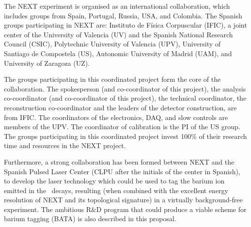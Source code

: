 The NEXT experiment is organised as an international collaboration, which includes groups from Spain, Portugal, Russia, USA, and Colombia. The Spanish groups participating in NEXT are: Instituto de Física Corpuscular (IFIC), a joint center of the University of Valencia (UV) and the Spanish National Research Council (CSIC), Polytechnic University of Valencia (UPV), University of Santiago de Compostela (US), Autonomic University of Madrid (UAM), and University of Zaragoza (UZ). 

The groups participating in this coordinated project form the core of the collaboration. The spokesperson (and co-coordinator of this project), the analysis co-coordinator (and co-coordinator of this project), the technical coordinator, the reconstruction co-coordinator and the leaders of the detector construction, are from IFIC. The coordinators of the electronics, DAQ, and slow controls are members of the UPV. The coordinator of calibration is the PI of the US group. The groups participating in this coordinated project invest 100\% of their research time and resources in the NEXT project. 

Furthermore, a strong collaboration has been  formed between NEXT and the Spanish Pulsed Laser Center (CLPU after the initials of the center in Spanish), to develop the laser technology which could be used to tag the barium ion emitted in the \bb\ decays, resulting (when combined with the excellent energy resolution of NEXT and its topological signature) in a virtually background-free experiment. The ambitious R\&D program that could produce a viable scheme for barium tagging (BATA) is also described in this proposal.  

%


